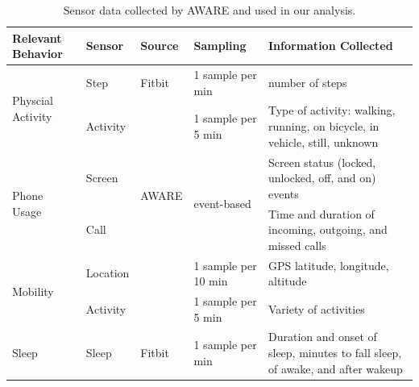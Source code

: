 \begin{table}[]
\centering
\smaller
\begin{tabular}{|l|l|l|l|p{5.5cm}|}
\hline
\textbf{Relevant Behavior}         & \textbf{Sensor} & \textbf{Source}        & \textbf{Sampling}            & \textbf{Information Collected}                                                 \\ \hline
\multirow{2}{*}{Physcial Activity} & Step            & Fitbit                 & 1 sample per min             & number of steps                                                                \\ \cline{2-5} 
                                   & Activity        & \multirow{4}{*}{AWARE} & 1 sample per 5 min           & Type of activity: walking, running, on bicycle, in vehicle, still, unknown     \\ \cline{1-2} \cline{4-5} 
\multirow{2}{*}{Phone Usage}                        & Screen          &                        & \multirow{2}{*}{event-based} & Screen status (locked, unlocked, off, and on) events                           \\ \cline{1-2} \cline{5-5} 
\multirow{2}{*}{Social Interactions} & Call            &                        &                              & Time and duration of incoming, outgoing, and missed calls                      \\ \cline{1-2} \cline{4-5} 
\multirow{2}{*}{Mobility}               & Location        &                        & 1 sample per 10 min          & GPS latitude, longitude, altitude                                              \\ \cline{2-2} \cline{4-5}
& Activity & & 1 sample per 5 min & Variety of activities \\ \hline
\multirow{2}{*}{Sleep }                             & Sleep           & Fitbit                 & 1 sample per min             & Duration and onset of sleep, minutes to fall sleep, of awake, and after wakeup \\ \hline
\end{tabular}

\caption[Sensors]{Sensor data collected by AWARE and used in our analysis.}
\label{tab:study-sensors}
\end{table}

